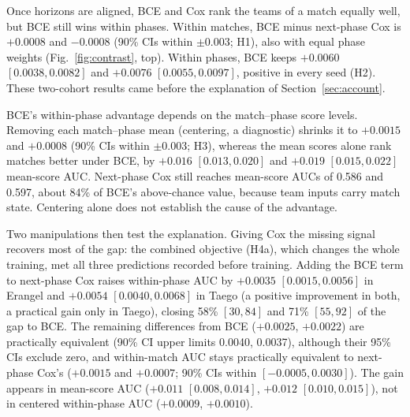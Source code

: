 \documentclass[sigconf,anonymous]{acmart}
\begin{document}
Once horizons are aligned, BCE and Cox rank the teams of a match equally well, but BCE still wins within phases. Within matches, BCE minus next-phase Cox is $+0.0008$ and $-0.0008$ (90\% CIs within $\pm0.003$; H1), also with equal phase weights (Fig.~\ref{fig:contrast}, top). Within phases, BCE keeps $+0.0060$ $[0.0038,\allowbreak 0.0082]$ and $+0.0076$ $[0.0055,\allowbreak 0.0097]$, positive in every seed (H2). These two-cohort results came before the explanation of Section~\ref{sec:account}.

BCE's within-phase advantage depends on the match--phase score levels. Removing each match--phase mean (centering, a diagnostic) shrinks it to $+0.0015$ and $+0.0008$ (90\% CIs within $\pm0.003$; H3), whereas the mean scores alone rank matches better under BCE, by $+0.016$ $[0.013,\allowbreak 0.020]$ and $+0.019$ $[0.015,\allowbreak 0.022]$ mean-score AUC. Next-phase Cox still reaches mean-score AUCs of 0.586 and 0.597, about 84\% of BCE's above-chance value, because team inputs carry match state. Centering alone does not establish the cause of the advantage.

Two manipulations then test the explanation. Giving Cox the missing signal recovers most of the gap: the combined objective (H4a), which changes the whole training, met all three predictions recorded before training. Adding the BCE term to next-phase Cox raises within-phase AUC by $+0.0035$ $[0.0015,\allowbreak 0.0056]$ in Erangel and $+0.0054$ $[0.0040,\allowbreak 0.0068]$ in Taego (a positive improvement in both, a practical gain only in Taego), closing 58\% $[30,\allowbreak 84]$ and 71\% $[55,\allowbreak 92]$ of the gap to BCE. The remaining differences from BCE ($+0.0025$, $+0.0022$) are practically equivalent (90\% CI upper limits 0.0040, 0.0037), although their 95\% CIs exclude zero, and within-match AUC stays practically equivalent to next-phase Cox's ($+0.0015$ and $+0.0007$; 90\% CIs within $[-0.0005,\allowbreak 0.0030]$). The gain appears in mean-score AUC ($+0.011$ $[0.008,\allowbreak 0.014]$, $+0.012$ $[0.010,\allowbreak 0.015]$), not in centered within-phase AUC ($+0.0009$, $+0.0010$).
\end{document}
